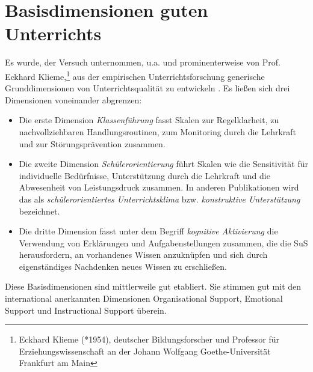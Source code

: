 \bip\bip
\section{Basisdimensionen guten Unterrichts}

Es wurde,  der Versuch unternommen, u.a. und prominenterweise von Prof. Eckhard Klieme,\footnote{Eckhard Klieme (*1954), deutscher Bildungsforscher und Professor f{\"u}r Erziehungswissenschaft an der Johann Wolfgang Goethe-Universit{\"a}t Frankfurt am Main} aus der empirischen Unterrichtsforschung generische Grunddimensionen von Unterrichtsqualit{\"a}t zu entwickeln \autocite{Klieme}. Es lie{\ss}en sich drei Dimensionen voneinander abgrenzen:

\begin{itemize}
\item
Die erste Dimension \emph{Klassenf{\"u}hrung} fasst Skalen zur Regelklarheit, zu nachvollziehbaren Handlungsroutinen, zum Monitoring durch die Lehrkraft und zur St{\"o}rungspr{\"a}vention zusammen.

\item
Die zweite Dimension \emph{Sch{\"u}lerorientierung} f{\"u}hrt Skalen wie die Sensitivit{\"a}t f{\"u}r individuelle Bed{\"u}rfnisse, Unterst{\"u}tzung durch die Lehrkraft und die Abwesenheit von Leistungsdruck zusammen. In anderen Publikationen wird das als \emph{sch{\"u}lerorientiertes Unterrichtsklima} bzw. \emph{konstruktive Unterst{\"u}tzung} bezeichnet.

\item
Die dritte Dimension fasst unter dem Begriff \emph{kognitive Aktivierung} die Verwendung von Erkl{\"a}rungen und Aufgabenstellungen zusammen, die die SuS herausfordern, an vorhandenes Wissen anzukn{\"u}pfen und sich durch eigenst{\"a}ndiges Nachdenken neues Wissen zu erschlie{\ss}en.
\end{itemize}

Diese Basisdimensionen sind mittlerweile gut etabliert. Sie stimmen gut mit den international anerkannten Dimensionen {\glqq}Organisational Support{\grqq}, {\glqq}Emotional Support{\grqq} und  {\glqq}Instructional Support{\grqq} {\"u}berein.

\bip\bip
